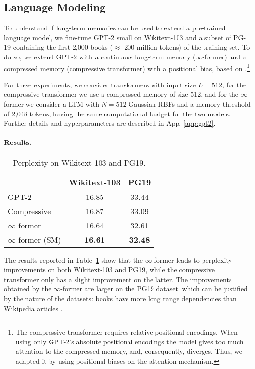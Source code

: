 \documentclass[11pt]{article}
\begin{document}
\subsection{Language Modeling}
\label{sec:gpt2}
To understand if long-term memories can be used to extend a pre-trained language model, we fine-tune GPT-2 small  \citep{radford2019language} on Wikitext-103 \citep{merity2016pointer} and a subset of PG-19 \citep{rae2019compressive} containing the first 2,000 books ($\approx$ 200 million tokens) 
of the training set. To do so, we extend GPT-2 with a continuous long-term memory (\mbox{$\infty$-former}) and a compressed memory (compressive transformer) with a positional bias, based on \citet{press2021train}.\footnote{The compressive transformer requires relative positional encodings. When using only GPT-2's absolute positional encodings the model gives too much attention to  the compressed memory, and, consequently, diverges. Thus, we adapted it by using positional biases on the attention mechanism.} 

For these experiments, we consider transformers with input size $L=512$, 
for the compressive transformer we use a compressed memory of size 512, and for the \mbox{$\infty$-former} we consider a LTM with $N=512$ Gaussian RBFs and a memory threshold of 2,048 tokens, having the same computational budget for the two models. 
Further details and hyperparameters are described in App. \ref{app:gpt2}.


\paragraph{Results. }
\begin{table}[t]
\centering \small
\setlength{\tabcolsep}{3.5ex}
\begin{tabular}{lcc}
\toprule
& Wikitext-103 & PG19 \\
\midrule
GPT-2 & 16.85 & 33.44 \\
Compressive & 16.87 & 33.09 \\
$\infty$-former & 16.64 & 32.61 \\
$\infty$-former (SM) & \textbf{16.61} & \textbf{32.48} \\
\bottomrule
\end{tabular}
\caption{Perplexity on Wikitext-103 and PG19.} 
\label{table:gpt2}
\end{table}

The results reported in Table~\ref{table:gpt2} show that the \mbox{$\infty$-former} leads to perplexity improvements 
on both Wikitext-103 and PG19, while the compressive transformer only has a slight improvement on the latter. 
The improvements obtained by the \mbox{$\infty$-former} are larger on the PG19 dataset, which can be justified by the nature of the datasets: books have more long range dependencies than Wikipedia articles \citep{rae2019compressive}.
\end{document}
